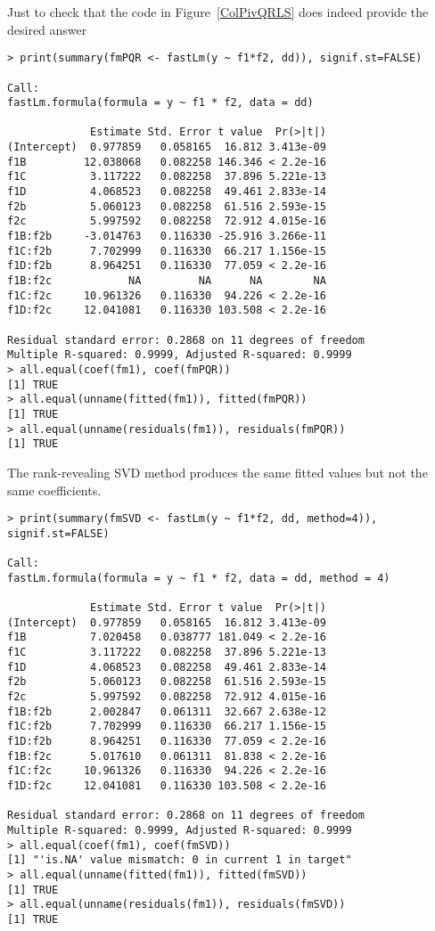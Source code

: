 \documentclass[shortnames,article,nojss]{jss}
\begin{document}
Just to check that the code in Figure~\ref{ColPivQRLS} does indeed provide the desired answer

\begin{verbatim}
> print(summary(fmPQR <- fastLm(y ~ f1*f2, dd)), signif.st=FALSE)

Call:
fastLm.formula(formula = y ~ f1 * f2, data = dd)

             Estimate Std. Error t value  Pr(>|t|)
(Intercept)  0.977859   0.058165  16.812 3.413e-09
f1B         12.038068   0.082258 146.346 < 2.2e-16
f1C          3.117222   0.082258  37.896 5.221e-13
f1D          4.068523   0.082258  49.461 2.833e-14
f2b          5.060123   0.082258  61.516 2.593e-15
f2c          5.997592   0.082258  72.912 4.015e-16
f1B:f2b     -3.014763   0.116330 -25.916 3.266e-11
f1C:f2b      7.702999   0.116330  66.217 1.156e-15
f1D:f2b      8.964251   0.116330  77.059 < 2.2e-16
f1B:f2c            NA         NA      NA        NA
f1C:f2c     10.961326   0.116330  94.226 < 2.2e-16
f1D:f2c     12.041081   0.116330 103.508 < 2.2e-16

Residual standard error: 0.2868 on 11 degrees of freedom
Multiple R-squared: 0.9999,	Adjusted R-squared: 0.9999
> all.equal(coef(fm1), coef(fmPQR))
[1] TRUE
> all.equal(unname(fitted(fm1)), fitted(fmPQR))
[1] TRUE
> all.equal(unname(residuals(fm1)), residuals(fmPQR))
[1] TRUE
\end{verbatim}

The rank-revealing SVD method produces the same fitted
values but not the same coefficients.

\begin{verbatim}
> print(summary(fmSVD <- fastLm(y ~ f1*f2, dd, method=4)), signif.st=FALSE)

Call:
fastLm.formula(formula = y ~ f1 * f2, data = dd, method = 4)

             Estimate Std. Error t value  Pr(>|t|)
(Intercept)  0.977859   0.058165  16.812 3.413e-09
f1B          7.020458   0.038777 181.049 < 2.2e-16
f1C          3.117222   0.082258  37.896 5.221e-13
f1D          4.068523   0.082258  49.461 2.833e-14
f2b          5.060123   0.082258  61.516 2.593e-15
f2c          5.997592   0.082258  72.912 4.015e-16
f1B:f2b      2.002847   0.061311  32.667 2.638e-12
f1C:f2b      7.702999   0.116330  66.217 1.156e-15
f1D:f2b      8.964251   0.116330  77.059 < 2.2e-16
f1B:f2c      5.017610   0.061311  81.838 < 2.2e-16
f1C:f2c     10.961326   0.116330  94.226 < 2.2e-16
f1D:f2c     12.041081   0.116330 103.508 < 2.2e-16

Residual standard error: 0.2868 on 11 degrees of freedom
Multiple R-squared: 0.9999,	Adjusted R-squared: 0.9999
> all.equal(coef(fm1), coef(fmSVD))
[1] "'is.NA' value mismatch: 0 in current 1 in target"
> all.equal(unname(fitted(fm1)), fitted(fmSVD))
[1] TRUE
> all.equal(unname(residuals(fm1)), residuals(fmSVD))
[1] TRUE
\end{verbatim}
\end{document}
